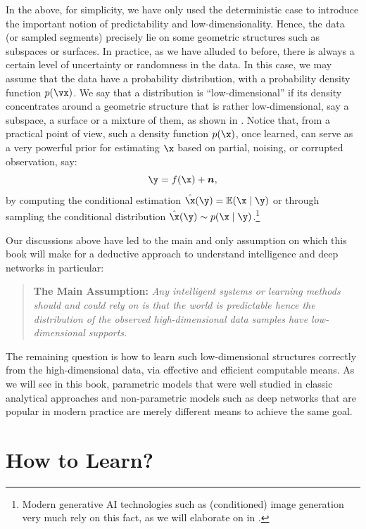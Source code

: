 \documentclass[../../book-main.tex]{subfiles}
\begin{document}
In the above, for simplicity, we have only used the deterministic case to introduce the important notion of predictability and low-dimensionality. Hence, the data (or sampled segments) precisely lie on some geometric structures such as subspaces or surfaces. In practice, as we have alluded to before, there is always a certain level of uncertainty or randomness in the data. In this case, we may assume that the data have a probability distribution, with a probability density function $p(\vx)$. We say that a distribution is ``low-dimensional'' if its density concentrates around a geometric structure that is rather low-dimensional, say a subspace, a surface or a mixture of them, as shown in . Notice that, from a practical point of view, such a density function $p(\x)$, once learned, can serve as a very powerful prior for estimating $\x$ based on partial, noising, or corrupted observation, say: 
\begin{equation}
\y = f(\x) + \boldsymbol{n},
\end{equation}
by computing the conditional estimation $\hat{\x}(\y) = \mathbb{E}(\x \mid \y)$ or through sampling the conditional distribution $\hat{\x}(\y) \sim p(\x\mid \y)$.\footnote{Modern generative AI technologies such as (conditioned) image generation very much rely on this fact, as we will elaborate on in .}

Our discussions above have led to the main and only assumption on which this book will make for a deductive approach to understand  intelligence and deep networks in particular: 
\begin{quote}
\textbf{The Main Assumption:} {\em Any intelligent systems or learning methods should and could rely on is that the world is predictable hence the distribution of the observed high-dimensional data samples have low-dimensional supports.}     \end{quote}
The remaining question is how to learn such low-dimensional structures correctly from the high-dimensional data, via effective and efficient computable means. As we will see in this book, parametric models that were well studied in classic analytical approaches and non-parametric models such as deep networks that are popular in modern practice are merely different means to achieve the same goal.

\section{How to Learn?}
\end{document}

